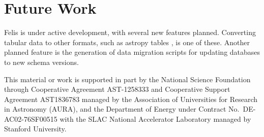 \documentclass[11pt,twoside]{article}
\begin{document}
\section{Future Work}

Felis is under active development, with several new features planned.
Converting tabular data to other formats, such as astropy tables \citep{2022ApJ...935..167A}, is one of these.
Another planned feature is the generation of data migration scripts for updating databases to new schema versions.

\acknowledgments This material or work is supported in part by the National Science Foundation through Cooperative Agreement AST-1258333 and Cooperative Support Agreement AST1836783 managed by the Association of Universities for Research in Astronomy (AURA), and the Department of Energy under Contract No.\ DE-AC02-76SF00515 with the SLAC National Accelerator Laboratory managed by Stanford University.


\end{document}
